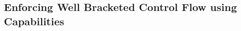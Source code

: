 \documentclass{beamer}
\begin{document}
%
%
%
%
%

\subsection{Enforcing Well Bracketed Control Flow using Capabilities} %
\end{document}
